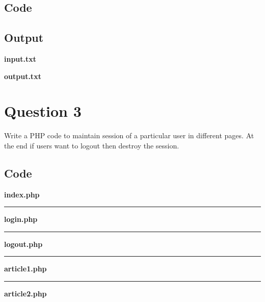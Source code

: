 \documentclass{article}
\begin{document}
\subsection*{Code}

\subsection*{Output}
\textbf{input.txt}

\textbf{output.txt}


\newpage
\section*{Question 3}
Write a PHP code to maintain session of a particular user in different pages.
At the end if users want to logout then destroy the session.
\subsection*{Code}
\textbf{index.php}

\par\noindent\rule{\textwidth}{0.4pt}
\textbf{login.php}

\par\noindent\rule{\textwidth}{0.4pt}
\textbf{logout.php}

\par\noindent\rule{\textwidth}{0.4pt}
\textbf{article1.php}

\par\noindent\rule{\textwidth}{0.4pt}
\textbf{article2.php}

\newpage
\end{document}
